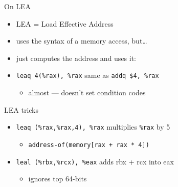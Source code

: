 
\begin{frame}[fragile,label=LEA]{On LEA}
    \begin{itemize}
    \item LEA = Load Effective Address
    \item uses the syntax of a memory access, but\ldots{}
    \item just computes the address and uses it:
    \item {}\lstinline|leaq 4(%rax), %rax| same as \lstinline|addq $4, %rax|
        \begin{itemize}
        \item almost --- doesn't set condition codes
        \end{itemize}
    \end{itemize}
\end{frame}

\begin{frame}[fragile,label=LEATricks]{LEA tricks}
    \begin{itemize}
    \item {}\lstinline|leaq (%rax,%rax,4), %rax| multiplies {\tt \%rax} by 5
        \begin{itemize}
        \item {\tt address-of(memory[rax + rax * 4])}
        \end{itemize}
    \item {}\lstinline|leal (%rbx,%rcx), %eax| adds rbx + rcx into eax
        \begin{itemize}
        \item ignores top 64-bits
        \end{itemize}
    \end{itemize}
\end{frame}
